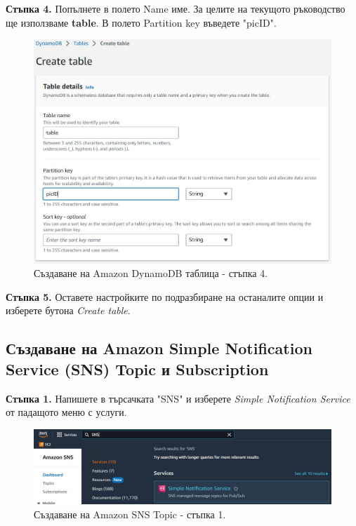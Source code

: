 \documentclass[12pt]{article}
\begin{document}
\noindent\textbf{Стъпка 4.} Попълнете в полето Name име. За целите на текущото ръководство ще използваме \textbf{table}. В полето Partition key въведете "picID".
\begin{figure}[h!]
\centering
    \includegraphics[scale=0.55]{instructions/dynamodb/4.JPG}
  \caption{Създаване на Amazon DynamoDB таблица - стъпка 4.}
\end{figure}

\noindent\textbf{Стъпка 5.} Оставете настройките по подразбиране на останалите опции и изберете бутона \textit{Create table}.

\clearpage
\pagebreak

\subsection{Създаване на Amazon Simple Notification Service (SNS) Topic и Subscription}
\noindent\textbf{Стъпка 1.} Напишете в търсачката "SNS" и изберете \textit{Simple Notification Service} от падащото меню с услуги.
\begin{figure}[h!]
\centering
    \includegraphics[scale=0.4]{instructions/sns/1.JPG}
  \caption{Създаване на Amazon SNS Topic - стъпка 1.}
\end{figure}
\end{document}
